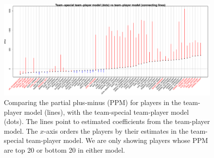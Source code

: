 \begin{figure}[htb!]
	\centering
	\includegraphics[width=\textwidth]{figures/ptsvspt_tb20.pdf}
	\caption{Comparing the partial plus-minus (PPM) for players in the team-player model (lines), with the team-special team-player model (dots). The lines point to estimated coefficients from the team-player model. The $x$-axis orders the players by their estimates in the team-special team-player model. We are only showing players whose PPM are top 20 or bottom 20 in either model.}\label{fig:pts-pt.tb20}
\end{figure}

